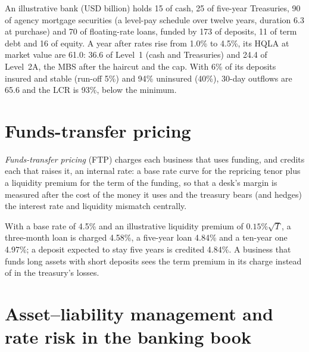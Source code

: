 \begin{example}\label{ex:rc:liquidity-and-funding-risk-bank-treasury:bank}
An illustrative bank (USD billion) holds 15 of cash, 25 of five-year Treasuries, 90 of agency mortgage
securities (a level-pay schedule over twelve years, duration 6.3 at purchase) and 70 of floating-rate
loans, funded by 173 of deposits, 11 of term debt and 16 of equity. A year after rates rise from 1.0\%
to 4.5\%, its HQLA at market value are 61.0: 36.6 of Level~1 (cash and Treasuries) and 24.4 of Level~2A,
the MBS after the haircut and the cap. With 6\% of its deposits insured and stable (run-off 5\%) and
94\% uninsured (40\%), 30-day outflows are 65.6 and the LCR is 93\%, below the minimum.
\end{example}

\label{lst:rc:liquidity-and-funding-risk-bank-treasury:lcr}

\section{Funds-transfer pricing}

\begin{definition}\label{def:rc:liquidity-and-funding-risk-bank-treasury:ftp}
\emph{Funds-transfer pricing} (FTP) charges each business that uses
funding, and credits each that raises it, an internal rate: a base rate curve for the repricing
tenor plus a liquidity premium for the term of the funding, so that a desk's margin is measured
after the cost of the money it uses and the treasury bears (and hedges) the interest rate and
liquidity mismatch centrally.
\end{definition}

\begin{example}\label{ex:rc:liquidity-and-funding-risk-bank-treasury:ftp}
With a base rate of 4.5\% and an illustrative liquidity premium of $0.15\%\sqrt T$, a three-month loan is
charged 4.58\%, a five-year loan 4.84\% and a ten-year one 4.97\%; a deposit expected to stay five years
is credited 4.84\%. A business that funds long assets with short deposits sees the term premium in its
charge instead of in the treasury's losses.
\end{example}

\section{Asset--liability management and rate risk in the banking book}

